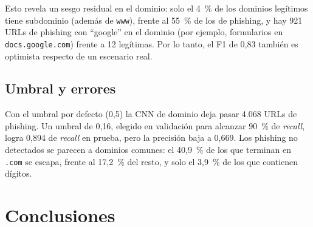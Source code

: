 \begin{table}[t]
\caption{Probabilidad de phishing en URLs escritas a mano}
\label{tab:manual}
\centering
{}
\end{table}

Esto revela un sesgo residual en el dominio: solo el 4~\% de los dominios legítimos tiene subdominio (además de \texttt{www}), frente al 55~\% de los de phishing, y hay 921 URLs de phishing con ``google'' en el dominio (por ejemplo, formularios en \texttt{docs.google.com}) frente a 12 legítimas. Por lo tanto, el F1 de 0,83 también es optimista respecto de un escenario real.

\subsection{Umbral y errores}
Con el umbral por defecto (0,5) la CNN de dominio deja pasar 4.068 URLs de phishing. Un umbral de 0,16, elegido en validación para alcanzar 90~\% de \emph{recall}, logra 0,894 de \emph{recall} en prueba, pero la precisión baja a 0,669. Los phishing no detectados se parecen a dominios comunes: el 40,9~\% de los que terminan en \texttt{.com} se escapa, frente al 17,2~\% del resto, y solo el 3,9~\% de los que contienen dígitos.

\section{Conclusiones}

